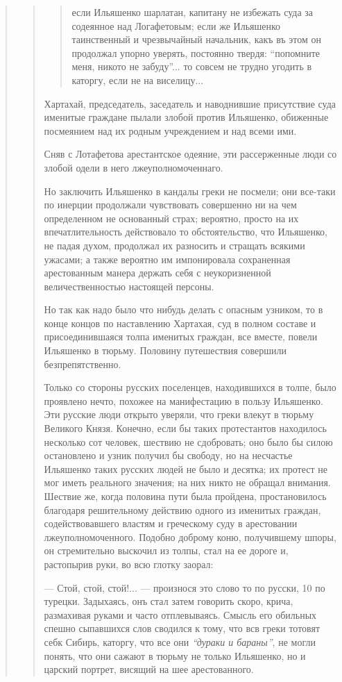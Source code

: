 \begin{quote}
\begin{quote}
\begin{quote}
если Ильяшенко шарлатан, капитану не избежать суда за содеянное над
Логафетовым; если же Ильяшенко таинственный и чрезвычайный начальник,
какъ въ этом он продолжал упорно уверять, постоянно твердя: ``попомните
меня, никото не забуду''... то совсем не трудно угодить в каторгу, если
не на виселицу...

\end{quote}

Хартахай, председатель, заседатель и наводнившие присутствие суда именитые граждане пылали
злобой против Ильяшенко, обиженные посмеянием над их родным учреждением и над всеми ими. 

Сняв с Лотафетова арестантское одеяние, эти рассерженные люди 
со злобой одели в него лжеуполномоченнаго.

Но заключить Ильяшенко в кандалы греки не посмели; они все-таки по инерции
продолжали чувствовать совершенно ни на чем определенном не основанный страх;
вероятно, просто на их впечатлительность действовало то обстоятельство, что
Ильяшенко, не падая духом, продолжал их разносить и стращать всякими ужасами; а
также вероятно им импонировала сохраненная арестованным манера держать себя с
неукоризненной величественностью настоящей персоны.

Но так как надо было что нибудь делать с опасным узником, 
то в конце концов по наставлению Хартахая, 
суд в полном составе и присоединившаяся толпа
именитых граждан, все вместе, повели Ильяшенко в
тюрьму. Половину путешествия совершили безпрепятственно.

Только со стороны русских поселенцев, находившихся в толпе, было проявлено
нечто, похожее на манифестацию в пользу Ильяшенко. Эти русские люди открыто
уверяли, что греки влекут в тюрьму Великого Князя.  Конечно, если бы таких
протестантов находилось несколько сот человек, шествию не сдобровать; оно было
бы силою остановлено и узник получил бы свободу, но на несчастье Ильяшенко
таких русских людей не было и десятка; их протест не мог иметь реального
значения; на них никто не обращал внимания. Шествие же, когда половина пути
была пройдена, простановилось благодаря решительному
действию одного из именитых граждан, содействовавшего
властям и греческому суду в арестовании лжеуполномоченного. 
Подобно доброму коню, получившему шпоры, он
стремительно выскочил из толпы, стал на ее дороге и,
растопырив руки, во всю глотку заорал:

— Стой, стой, стой!... — произнося это слово то по русски, 10 по турецки.
Задыхаясь, онъ стал затем говорить скоро, крича, размахивая руками и часто
отплевываясь. Смысль его обильных спешно сыпавшихся слов сводился к тому, что
всв греки тотовят себк Сибирь, каторгу, что все они \emph{``дураки и бараны''},
не могли понять, что они сажают в тюрьму не только Ильяшенко, но и царский
портрет, висящий на шее арестованного.


\end{quote}
\end{quote}
